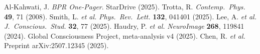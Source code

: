 \documentclass[11pt]{article}
\begin{document}
\vspace{-4pt}

\begin{thebibliography}{9}\setlength{\itemsep}{0pt}
 Al-Kahwati, J. \emph{BPR One-Pager}. StarDrive (2025).
 Trotta, R. \emph{Contemp.~Phys.} \textbf{49}, 71 (2008).
 Smith, L. \textit{et al.} \emph{Phys.~Rev.~Lett.} \textbf{132}, 041401 (2025).
 Lee, A. \textit{et al.} \emph{J.~Conscious.~Stud.} \textbf{32}, 77 (2025).
 Haudry, P. \textit{et al.} \emph{NeuroImage} \textbf{268}, 119841 (2024).
 Global Consciousness Project, meta-analysis v4 (2025).
 Chen, R. \textit{et al.} Preprint arXiv:2507.12345 (2025).
\end{thebibliography}
\end{document}

